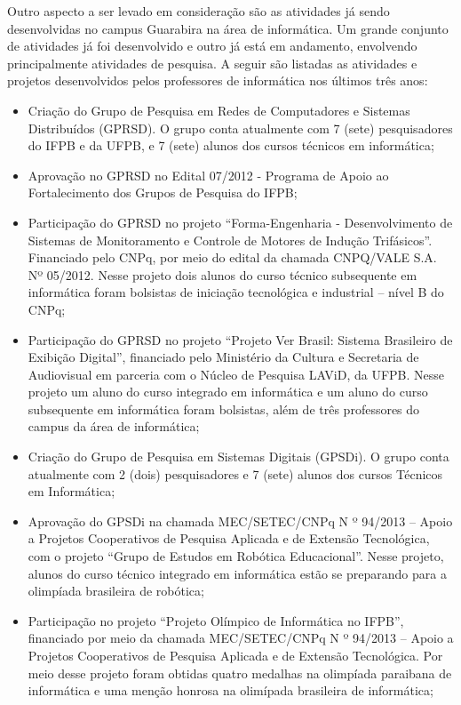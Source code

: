 	Outro aspecto a ser levado em consideração são as atividades já sendo desenvolvidas no campus Guarabira na área de informática. Um grande conjunto de atividades já foi desenvolvido e outro já está em andamento, envolvendo principalmente atividades de pesquisa. A seguir são listadas as atividades e projetos desenvolvidos pelos professores de informática nos últimos tr\^es anos:

\begin{itemize}
\item Criação do Grupo de Pesquisa em Redes de Computadores e Sistemas Distribuídos (GPRSD). O grupo conta atualmente com 7 (sete) pesquisadores do IFPB e da UFPB, e 7 (sete) alunos dos cursos técnicos em informática;

\item Aprovação no GPRSD no Edital 07/2012 - Programa de Apoio ao Fortalecimento dos Grupos de Pesquisa do IFPB;

\item Participação do GPRSD no projeto ``Forma-Engenharia - Desenvolvimento de Sistemas de Monitoramento e Controle de Motores de Indução Trifásicos''. Financiado pelo CNPq, por meio do edital da chamada CNPQ/VALE S.A. Nº 05/2012. Nesse projeto dois alunos do curso técnico subsequente em informática foram bolsistas de iniciação tecnológica e industrial – nível B do CNPq;

\item Participação do GPRSD no projeto ``Projeto Ver Brasil: Sistema Brasileiro de Exibição Digital'', financiado pelo Ministério da Cultura e Secretaria de Audiovisual em parceria com o Núcleo de Pesquisa LAViD, da UFPB. Nesse projeto um aluno do curso integrado em informática e um aluno do curso subsequente em informática foram bolsistas, além de três professores do campus da área de informática;

\item Criação do Grupo de Pesquisa em Sistemas Digitais (GPSDi). O grupo conta atualmente com 2 (dois) pesquisadores e 7 (sete) alunos dos cursos Técnicos em Informática;

\item Aprovação do GPSDi na chamada MEC/SETEC/CNPq N º 94/2013 – Apoio a Projetos Cooperativos de Pesquisa Aplicada e de Extensão Tecnológica, com o projeto “Grupo de Estudos em Robótica Educacional”.  Nesse projeto, alunos do curso técnico integrado em informática estão se preparando para a olimpíada brasileira de robótica;

\item Participação no projeto ``Projeto Olímpico de Informática no IFPB'', financiado por meio da chamada MEC/SETEC/CNPq N º 94/2013 – Apoio a Projetos Cooperativos de Pesquisa Aplicada e de Extensão Tecnológica. Por meio desse projeto foram obtidas quatro medalhas na olimp\'iada paraibana de inform\'atica e uma men\c{c}\~ao honrosa na olim\'ipada brasileira de inform\'atica;


\end{itemize}
